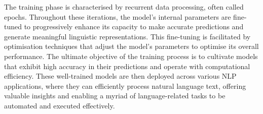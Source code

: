 The training phase is characterised by recurrent data processing, often called epochs. Throughout these iterations, the model's internal parameters are fine-tuned to progressively enhance its capacity to make accurate predictions and generate meaningful linguistic representations. This fine-tuning is facilitated by optimisation techniques that adjust the model's parameters to optimise its overall performance. The ultimate objective of the training process is to cultivate models that exhibit high accuracy in their predictions and operate with computational efficiency. These well-trained models are then deployed across various NLP applications, where they can efficiently process natural language text, offering valuable insights and enabling a myriad of language-related tasks to be automated and executed effectively.
